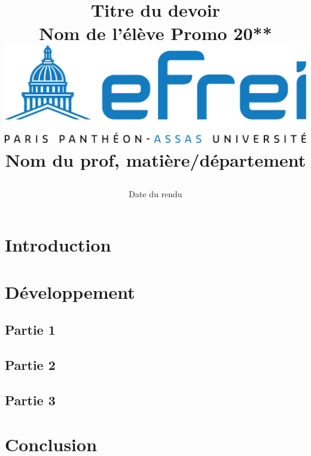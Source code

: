 \documentclass[a4paper, 11pt]{report}
\begin{document}
\begin{title}

\title{
    {\Huge Titre du devoir}\\
    \vspace{1 cm}
    {\LARGE Nom de l'élève Promo 20**}\\
    \vspace{2.5 cm}
    {\includegraphics{logo_efrei}}\\
    \vspace{2.5 cm}
    {\Large Nom du prof, matière/département}\\
    \vspace{1 cm}
    {\date{\Large Date du rendu}}}
\end{title}

\maketitle
\tableofcontents
\clearpage



\section{Introduction}


\section{Développement}


\subsection{Partie 1}


\subsection{Partie 2}


\subsection{Partie 3}


\section{Conclusion}

\end{document}
